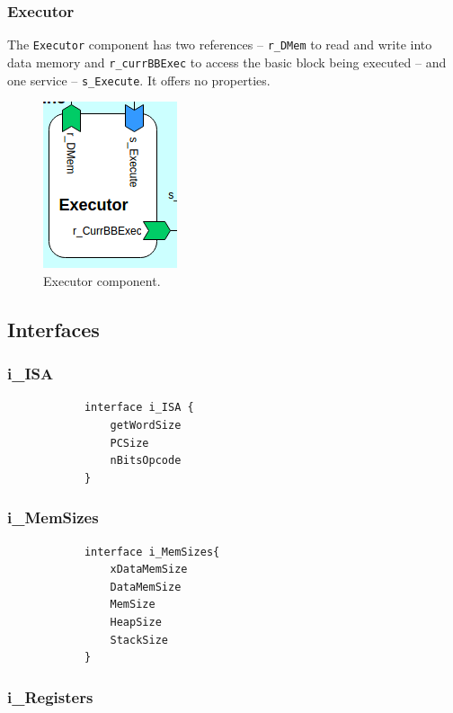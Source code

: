 \documentclass{report}
\begin{document}
			\subsubsection{Executor}
			
			\par The \texttt{Executor} component has two references -- \texttt{r\_DMem} to read and write into data memory and \texttt{r\_currBBExec} to access the basic block being executed -- and one service -- \texttt{s\_Execute}. It offers no properties.

			\begin{figure} [H]
				\centering
				\includegraphics[width=0.3\linewidth]{Images/arch-ref/Executor}
				\caption{Executor component.}
				\label{fig:Executor}
			\end{figure}
			
		\subsection{Interfaces}

			\subsubsection*{i\_ISA}
			
			\begin{lstlisting}
			interface i_ISA {
				getWordSize	
				PCSize
				nBitsOpcode
			}
			\end{lstlisting} 
			
			\subsubsection*{i\_MemSizes}	
			
			\begin{lstlisting}
			interface i_MemSizes{
				xDataMemSize 	
				DataMemSize 	
				MemSize			
				HeapSize			
				StackSize		
			}
			\end{lstlisting} 	

			\subsubsection*{i\_Registers}
			
\end{document}

